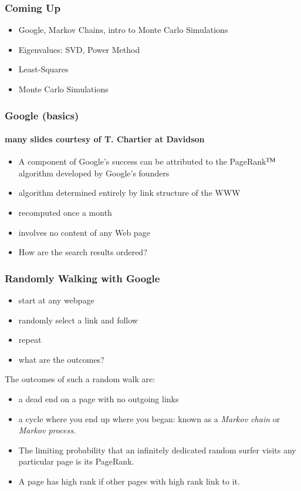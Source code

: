 \documentclass[10pt]{beamer}
\begin{document}
\begin{frame}
\frametitle{Coming Up}
  \begin{itemize}
    \item Google, Markov Chains, intro to Monte Carlo Simulations
    \item Eigenvalues: SVD, Power Method
    \item Least-Squares
    \item Monte Carlo Simulations
  \end{itemize}
\end{frame}
\begin{frame}
\frametitle{Google (basics)}
\framesubtitle{many slides courtesy of T. Chartier at Davidson}
\begin{itemize}
  \item A component of Google's success can be
attributed to the PageRank$^{\rm TM}$ algorithm developed by
Google's founders
  \item  algorithm determined entirely by link structure of the WWW
  \item recomputed once a month
  \item involves no content of any Web page
  \item How are the search results ordered?
\end{itemize}
\end{frame}
\begin{frame}
\frametitle{Randomly Walking with Google}

\begin{itemize}
    \item start at any webpage
    \item randomly select a link and follow
    \item repeat
    \item what are the outcomes?
\end{itemize}
\bigskip

The outcomes of such a random walk are:
\begin{itemize}
\item a dead end on a page with no outgoing links
\item a cycle where you end up where you began: known as a \emph{Markov
chain} or \emph{Markov process}.
\item The limiting probability that an infinitely dedicated random
surfer visits any particular page is its PageRank.
\item A page has high rank if other pages with high rank link to
it.
\end{itemize}
\end{frame}
\end{document}
